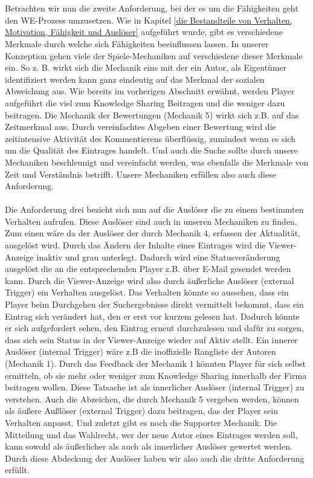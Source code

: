 \documentclass[a4paper,12pt,twoside]{scrartcl}
\begin{document}
\\\\
Betrachten wir nun die zweite Anforderung, bei der es um die Fähigkeiten geht den WE-Prozess umzusetzen. Wie in Kapitel \ref{die Bestandteile von Verhalten, Motivation, Fähigkeit und Auslöser} aufgeführt wurde, gibt es verschiedene Merkmale durch welche sich Fähigkeiten beeinflussen lassen. In unserer Konzeption gehen viele der Spiele-Mechaniken auf verschiedene dieser Merkmale ein. So z. B. wirkt sich die Mechanik eins mit der ein Autor, als Eigentümer identifiziert werden kann ganz eindeutig auf das Merkmal der sozialen Abweichung aus. Wie bereits im vorherigen Abschnitt erwähnt, werden Player aufgeführt die viel zum Knowledge Sharing Beitragen und die weniger dazu beitragen. Die Mechanik der Bewertungen (Mechanik 5) wirkt sich z.B. auf das Zeitmerkmal aus. Durch vereinfachtes Abgeben einer Bewertung wird die zeitintensive Aktivität des Kommentierens überflüssig, zumindest wenn es sich um die Qualität des Eintrages handelt. Und auch die Suche sollte durch unsere Mechaniken beschleunigt und vereinfacht werden, was ebenfalls die Merkmale von Zeit und Verständnis betrifft. Unsere Mechaniken erfüllen also auch diese Anforderung.
\\\\
Die Anforderung drei bezieht sich nun auf die Auslöser die zu einem bestimmten Verhalten aufrufen. Diese Auslöser sind auch in unseren Mechaniken zu finden. Zum einen wäre da der Auslöser der durch Mechanik 4, erfassen der Aktualität, ausgelöst wird. Durch das Ändern der Inhalte eines Eintrages wird die Viewer-Anzeige inaktiv und grau unterlegt. Dadurch wird eine Statusveränderung ausgelöst die an die entsprechenden Player z.B. über E-Mail gesendet werden kann. Durch die Viewer-Anzeige wird also durch äußerliche Auslöser (external Trigger) ein Verhalten ausgelöst. Das Verhalten könnte so aussehen, dass ein Player beim Durchgehen der Suchergebnisse direkt vermittelt bekommt, dass ein Eintrag sich verändert hat, den er erst vor kurzem gelesen hat. Dadurch könnte er sich aufgefordert sehen, den Eintrag erneut durchzulesen und dafür zu sorgen, dass sich sein Status in der Viewer-Anzeige wieder auf Aktiv stellt. Ein innerer Auslöser (internal Trigger) wäre z.B die inoffizielle Rangliste der Autoren (Mechanik 1). Durch das Feedback der Mechanik 1 könnten Player für sich selbst ermitteln, ob sie mehr oder weniger zum Knowledge Sharing innerhalb der Firma beitragen wollen. Diese Tatsache ist als innerlicher Auslöser (internal Trigger) zu verstehen. Auch die Abzeichen, die durch Mechanik 5 vergeben werden, können als äußere Außlöser (external Trigger) dazu beitragen, das der Player sein Verhalten anpasst. Und zuletzt gibt es noch die Supporter Mechanik. Die Mitteilung und das Wahlrecht, wer der neue Autor eines Eintrages werden soll, kann sowohl als äußerlicher als auch als innerlicher Auslöser gewertet werden. Durch diese Abdeckung der Auslöser haben wir also auch die dritte Anforderung erfüllt.
\end{document}
